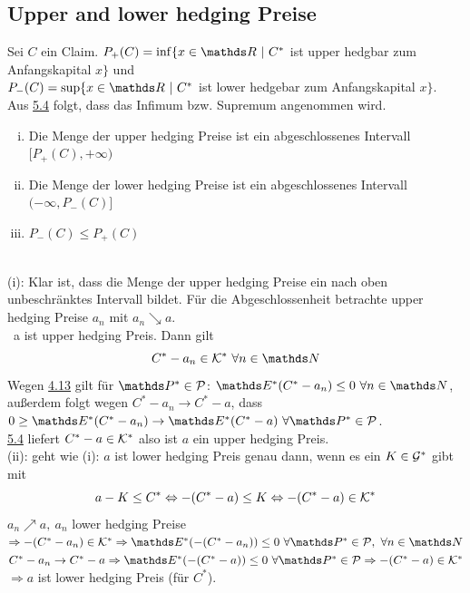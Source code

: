 \subsection{Upper and lower hedging Preise}
\label{sub:upper_lower_preise}
Sei $C$ ein Claim.
$P_+(C)=\inf\{x\in \R~|~C^*$ ist upper hedgbar zum Anfangskapital $x\}$ und\\
$P_-(C)=\sup\{x\in \R~|~C^*$ ist lower hedgebar zum Anfangskapital $x \}$.\\
Aus \hyperref[sub:satz_4fima]{5.4} folgt, dass das Infimum bzw. Supremum angenommen wird.

\begin{enumerate}[(i)]
	\item Die Menge der upper hedging Preise ist ein abgeschlossenes Intervall $[P_+(C),+\infty)$
	\item Die Menge der lower hedging Preise ist ein abgeschlossenes Intervall $(-\infty,P_-(C)]$
	\item $P_-(C)\le P_+(C)$
\end{enumerate}

\\
(i): Klar ist, dass die Menge der upper hedging Preise ein nach oben unbeschränktes Intervall bildet.
Für die Abgeschlossenheit betrachte upper hedging Preise $a_n$ mit $a_n\searrow a$.\\
\zz~a ist upper hedging Preis.
Dann gilt 
\[
C^*-a_n\in \mc{K}^*~\forall n\in\N
\]
Wegen \hyperref[sub:satz_2fima]{4.13} gilt für $\Pw^*\in\mc{P}$: $\E^*(C^*-a_n)\le 0~\forall n\in \N$, außerdem folgt wegen $C^*-a_n\to C^*-a$, dass $0\ge \E^*(C^*-a_n)\to \E^*(C^*-a) ~\forall \Pw^*\in \mc{P}$.\\
\hyperref[sub:satz_4fima]{5.4} liefert $C^*-a\in \mathcal{K}^*$ also ist $a$ ein upper hedging Preis.\\

(ii): geht wie (i): $a$ ist lower hedging Preis genau dann, wenn es ein $K\in \mathcal{G}^*$ gibt mit
\[
a-K\le C^* \Leftrightarrow -(C^*-a)\le K \Leftrightarrow -(C^*-a)\in \mathcal{K}^*
\]
$a_n \nearrow a,~a_n$ lower hedging Preise $\Rightarrow -(C^*-a_n)\in\mc{K}^*\Rightarrow\E^*(-(C^*-a_n))\le 0~\forall\Pw^*\in\mc{P},~\forall n\in\N$\\
$C^*-a_n\to C^*-a\Rightarrow\E^*(-(C^*-a))\le0~\forall \Pw^*\in\mc{P}\Rightarrow-(C^*-a)\in\mc{K}^*$\\
$\Rightarrow a$ ist lower hedging Preis (für $C^*$).\\

